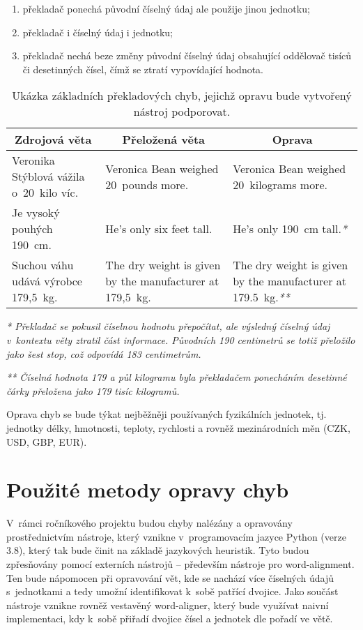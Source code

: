 \documentclass[12pt,a4paper]{article}
\begin{document}
	\begin{enumerate}
		\item překladač ponechá původní číselný údaj ale použije jinou jednotku;
		\item překladač  i číselný údaj i jednotku;
		\item překladač nechá beze změny původní číselný údaj obsahující oddělovač tisíců či desetinných čísel, čímž se ztratí vypovídající hodnota.
	\end{enumerate}

	\begin{table}[htb]
		\caption{Ukázka základních překladových chyb, jejichž opravu bude vytvořený nástroj podporovat.}
		\begin{tabularx}{\textwidth}{XXX}
			\multicolumn{1}{c}{\textbf{Zdrojová věta}} & \multicolumn{1}{c}{\textbf{Přeložená věta}}              & \multicolumn{1}{c}{\textbf{Oprava}}                                \\ \hline \hline
			Veronika Stýblová vážila o~20~kilo víc.    & Veronica Bean weighed 20~pounds more.                    & Veronica Bean weighed 20~kilograms more.                 		   \\ \hline
			Je vysoký pouhých 190~cm.                  & He's only six feet tall.                                 & He's only 190~cm tall.\textit{*}                                   \\ \hline
			Suchou váhu udává výrobce 179,5~kg.        & The dry weight is given by the manufacturer at 179,5~kg. & The dry weight is given by the manufacturer at 179.5~kg.\textit{**}  
		\end{tabularx}
	
		\vspace{1em}
		\textit{* Překladač se pokusil číselnou hodnotu přepočítat, ale výsledný číselný údaj v~kontextu věty ztratil část informace. Původních 190 centimetrů se totiž přeložilo jako šest stop, což odpovídá 183 centimetrům.}   
		
		\textit{** Číselná hodnota 179 a půl kilogramu byla překladačem ponecháním desetinné čárky přeložena jako 179 tisíc kilogramů.}  
	\end{table}

	Oprava chyb se bude týkat nejběžněji používaných fyzikálních jednotek, tj. jednotky délky, hmotnosti, teploty, rychlosti a rovněž mezinárodních měn (CZK, USD, GBP, EUR).

	\section{Použité metody opravy chyb}
	V~rámci ročníkového projektu budou chyby nalézány a opravovány prostřednictvím nástroje, který vznikne v~programovacím jazyce Python (verze 3.8), který tak bude činit na základě jazykových heuristik. Tyto budou zpřesňovány pomocí externích nástrojů -- především nástroje pro word-alignment. Ten bude nápomocen při opravování vět, kde se nachází více číselných údajů s~jednotkami a tedy umožní identifikovat k~sobě patřící dvojice. Jako součást nástroje vznikne rovněž vestavěný word-aligner, který bude využívat naivní implementaci, kdy k~sobě přiřadí dvojice čísel a jednotek dle pořadí ve větě. 
	
\end{document}
